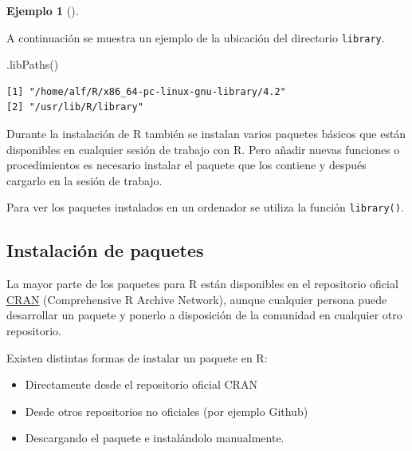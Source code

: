 \documentclass[
  a4paper,
]{scrreport}
\newenvironment{Shaded}{\begin{snugshade}}{\end{snugshade}}
\newcommand{\FunctionTok}[1]{\textcolor[rgb]{0.28,0.35,0.67}{#1}}
\newcommand{\NormalTok}[1]{\textcolor[rgb]{0.00,0.23,0.31}{#1}}
\providecommand{\tightlist}{%
  \setlength{\itemsep}{0pt}\setlength{\parskip}{0pt}}\usepackage{longtable,booktabs,array}
\theoremstyle{definition}
\newtheorem{example}{Ejemplo}[chapter]
\theoremstyle{definition}
\theoremstyle{remark}
\begin{document}
\leavevmode{}%
\begin{example}[]\label{exm-ubiacion-biblioteca-paquetes}

A continuación se muestra un ejemplo de la ubicación del directorio
\texttt{library}.

\begin{Shaded}
\begin{Highlighting}[]
\FunctionTok{.libPaths}\NormalTok{()}
\end{Highlighting}
\end{Shaded}

\begin{verbatim}
[1] "/home/alf/R/x86_64-pc-linux-gnu-library/4.2"
[2] "/usr/lib/R/library"                         
\end{verbatim}

\end{example}

Durante la instalación de R también se instalan varios paquetes básicos
que están disponibles en cualquier sesión de trabajo con R. Pero añadir
nuevas funciones o procedimientos es necesario instalar el paquete que
los contiene y después cargarlo en la sesión de trabajo.

Para ver los paquetes instalados en un ordenador se utiliza la función
\texttt{library()}.

\hypertarget{instalaciuxf3n-de-paquetes}{%
\subsection{Instalación de paquetes}\label{instalaciuxf3n-de-paquetes}}

La mayor parte de los paquetes para R están disponibles en el
repositorio oficial
\href{Comprehensive\%20R\%20Archive\%20Network}{CRAN} (Comprehensive R
Archive Network), aunque cualquier persona puede desarrollar un paquete
y ponerlo a disposición de la comunidad en cualquier otro repositorio.

Existen distintas formas de instalar un paquete en R:

\begin{itemize}
\tightlist
\item
  Directamente desde el repositorio oficial CRAN
\item
  Desde otros repositorios no oficiales (por ejemplo Github)
\item
  Descargando el paquete e instalándolo manualmente.
\end{itemize}
\end{document}
